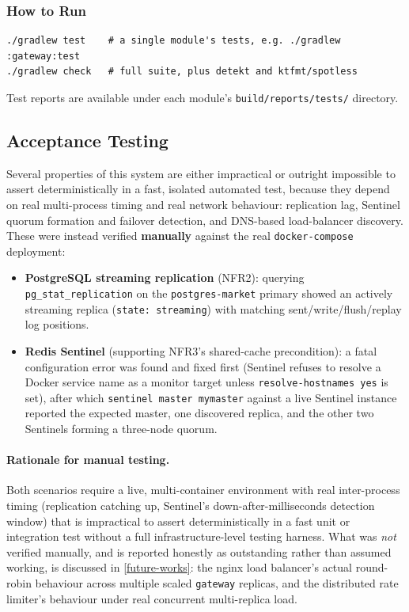 \documentclass{scrartcl}
\begin{document}
\subsubsection{How to Run}\label{testing-how-to-run}

\begin{verbatim}
./gradlew test    # a single module's tests, e.g. ./gradlew :gateway:test
./gradlew check   # full suite, plus detekt and ktfmt/spotless
\end{verbatim}

Test reports are available under each module's \texttt{build/reports/tests/} directory.

\subsection{Acceptance Testing}\label{acceptance-test}

Several properties of this system are either impractical or outright impossible to assert
deterministically in a fast, isolated automated test, because they depend on real multi-process
timing and real network behaviour: replication lag, Sentinel quorum formation and failover
detection, and DNS-based load-balancer discovery. These were instead verified \textbf{manually}
against the real \texttt{docker-compose} deployment:

\begin{itemize}
  \item \textbf{PostgreSQL streaming replication} (NFR2): querying
  \texttt{pg\_stat\_replication} on the \texttt{postgres-market} primary showed an actively
  streaming replica (\texttt{state: streaming}) with matching sent/write/flush/replay log
  positions.
  \item \textbf{Redis Sentinel} (supporting NFR3's shared-cache precondition): a fatal
  configuration error was found and fixed first (Sentinel refuses to resolve a Docker service name
  as a monitor target unless \texttt{resolve-hostnames yes} is set), after which
  \texttt{sentinel master mymaster} against a live Sentinel instance reported the expected
  master, one discovered replica, and the other two Sentinels forming a three-node quorum.
\end{itemize}

\paragraph{Rationale for manual testing.} Both scenarios require a live, multi-container
environment with real inter-process timing (replication catching up, Sentinel's
down-after-milliseconds detection window) that is impractical to assert deterministically in a
fast unit or integration test without a full infrastructure-level testing harness. What was
\emph{not} verified manually, and is reported honestly as outstanding rather than assumed
working, is discussed in \cref{future-works}: the nginx load balancer's actual round-robin
behaviour across multiple scaled \texttt{gateway} replicas, and the distributed rate limiter's
behaviour under real concurrent multi-replica load.
\end{document}
